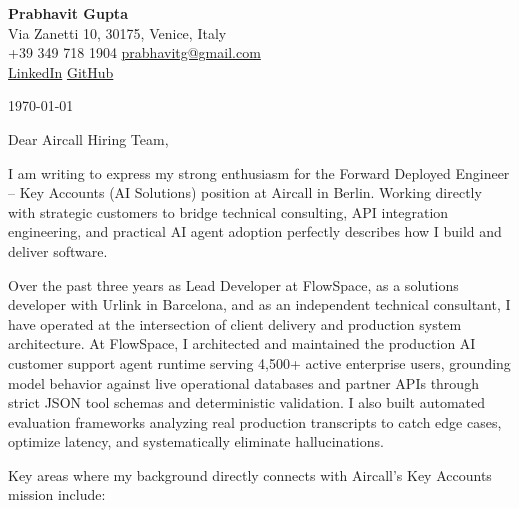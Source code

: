 \documentclass[11pt,a4paper]{article}
\begin{document}
\begin{center}
    {\huge \textbf{Prabhavit Gupta}} \\
    \vspace{4pt}
    Via Zanetti 10, 30175, Venice, Italy \\
    +39 349 718 1904 \textbar{} \href{mailto:prabhavitg@gmail.com}{prabhavitg@gmail.com} \\
    \href{https://www.linkedin.com/in/prabhavit/}{LinkedIn} \textbar{} \href{https://github.com/prab-gupta}{GitHub}
\end{center}

\vspace{10pt}

\noindent \today

\vspace{6pt}

\noindent Dear Aircall Hiring Team,

\vspace{6pt}

\noindent I am writing to express my strong enthusiasm for the Forward Deployed Engineer – Key Accounts (AI Solutions) position at Aircall in Berlin. Working directly with strategic customers to bridge technical consulting, API integration engineering, and practical AI agent adoption perfectly describes how I build and deliver software.

\noindent Over the past three years as Lead Developer at FlowSpace, as a solutions developer with Urlink in Barcelona, and as an independent technical consultant, I have operated at the intersection of client delivery and production system architecture. At FlowSpace, I architected and maintained the production AI customer support agent runtime serving 4,500+ active enterprise users, grounding model behavior against live operational databases and partner APIs through strict JSON tool schemas and deterministic validation. I also built automated evaluation frameworks analyzing real production transcripts to catch edge cases, optimize latency, and systematically eliminate hallucinations.

\noindent Key areas where my background directly connects with Aircall's Key Accounts mission include:
\end{document}
